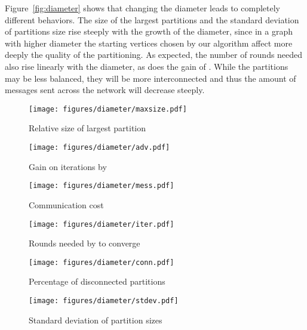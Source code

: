 Figure~\ref{fig:diameter} shows that changing the diameter leads to completely
different behaviors. The size of the largest partitions and the standard
deviation of partitions size rise steeply with the growth of the diameter,
since in a graph with higher diameter the starting vertices chosen by our
algorithm affect more deeply the quality of the partitioning. As expected, the
number of rounds needed also rise linearly with the diameter, as does the gain
of \etsch. While the partitions may be less balanced, they will be more
interconnected and thus the amount of messages sent across the network will
decrease steeply.

\begin{figure*}
\setlength{\belowcaptionskip}{-5pt}

\begin{center}
\begin{subfigure}[b]{0.3\textwidth}
\texttt{[image: figures/diameter/maxsize.pdf]}
\caption{Relative size of largest partition}
\label{}
\end{subfigure}
\begin{subfigure}[b]{0.3\textwidth}
\texttt{[image: figures/diameter/adv.pdf]}
\caption{Gain on iterations by \etsch}
\label{}
\end{subfigure}
\begin{subfigure}[b]{0.3\textwidth}
\texttt{[image: figures/diameter/mess.pdf]}
\caption{Communication cost}
\label{}
\end{subfigure}
\end{center}


\vspace{-10pt}
\begin{center}
\begin{subfigure}[b]{0.3\textwidth}
\texttt{[image: figures/diameter/iter.pdf]}
\caption{Rounds needed by \dfep to converge}
\label{}
\end{subfigure}
\begin{subfigure}[b]{0.3\textwidth}
\texttt{[image: figures/diameter/conn.pdf]}
\caption{Percentage of disconnected partitions}
\label{}
\end{subfigure}
\begin{subfigure}[b]{0.3\textwidth}
\texttt{[image: figures/diameter/stdev.pdf]}
\caption{Standard deviation of partition sizes}
\label{}
\end{subfigure}
\end{center}

\caption{Behavior of \dfep with graphs of same size but different diameter ($K=20$, $100$ samples)}
\label{fig:diameter}
\end{figure*}

